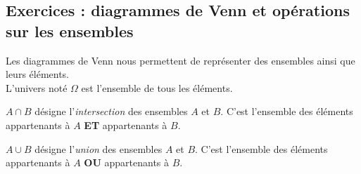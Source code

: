 \documentclass[main.tex]{subfiles}
\begin{document}
\subsection{Exercices : diagrammes de Venn et opérations sur les ensembles}
\begin{eBox}
Les diagrammes de Venn nous permettent de représenter des ensembles ainsi que leurs éléments.\\  L'univers noté $\Omega$ est l'ensemble de tous les éléments. 
\end{eBox}
\noindent
\parbox{0.32\linewidth}{
 \og $A\cap B$\fg{} désigne l'\emph{intersection} des ensembles $A$ et $B$. C'est l'ensemble des éléments appartenants à $A$ \textbf{ET} appartenants à $B$.
} 
\parbox{0.18\linewidth}{
\begin{venndiagram2sets}[tikzoptions={scale=0.6,thick}]
	\fillACapB
	\setpostvennhook
	{
	}
\end{venndiagram2sets} 
}
\hfill 
\parbox{0.3\linewidth}{
\og $A\cup B$\fg{} désigne l'\emph{union} des ensembles $A$ et $B$. C'est l'ensemble des éléments appartenants à $A$ \textbf{OU} appartenants à $B$.
}
\parbox{0.18\linewidth}{
\begin{venndiagram2sets}[tikzoptions={scale=0.6,thick}]
	\fillA \fillB 
	\setpostvennhook
	{
	}
\end{venndiagram2sets} 
} 
\end{document}
